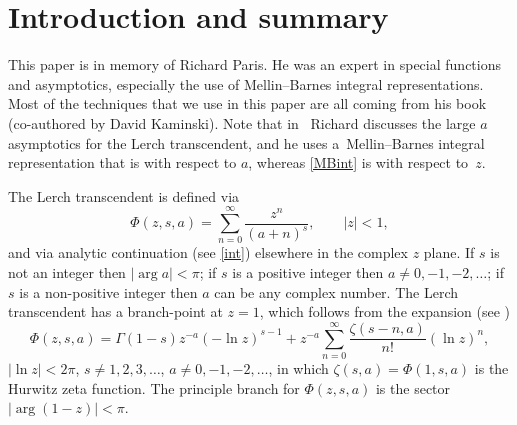 \section{Introduction and summary}
This paper is in memory of Richard Paris. He was an expert in special functions and
asymptotics, especially the use of Mellin--Barnes integral representations.
Most of the techniques that we use in this paper are all coming from his
book \cite{Paris2001} (co-authored by David Kaminski). Note that in~\cite{paris2016stokes} Richard
discusses the large $a$ asymptotics for the Lerch transcendent, and he uses a~Mellin--Barnes
integral representation that is with respect to $a$, whereas \eqref{MBint} is with respect to~$z$.

The Lerch transcendent is defined via
\begin{equation}\label{Phi}
 \Phi(z,s,a)=\sum_{n=0}^{\infty}\frac{z^{n}}{(a+n)^{s}},
 \qquad |z|<1,
\end{equation}
and via analytic continuation (see \eqref{int}) elsewhere in the complex $z$ plane.
If $s$ is not an integer then $|\arg a|<\pi$; if $s$ is a positive integer then
$a\not= 0,-1,-2,\ldots$; if $s$ is a non-positive integer then $a$ can be any complex number.
The Lerch transcendent has a branch-point at $z=1$, which follows from the expansion
(see \cite[Section~1.11\,(8)]{Erdelyi:1953:HTF1})
\begin{equation*}%
 \Phi(z,s,a)=\Gamma(1-s) z^{-a} (-\ln z)^{s-1}+z^{-a}
 \sum_{n=0}^{\infty}\frac{\zeta(s-n,a)}{n!}(\ln z)^n,
\end{equation*}
$|\ln z|<2\pi$, $s\not=1,2,3,\ldots$, $a\not=0,-1,-2,\ldots$, in which
$\zeta(s,a)=\Phi(1,s,a)$ is the Hurwitz zeta function.
The principle branch for $\Phi(z,s,a)$ is the sector $|\arg (1-z)|<\pi$.

